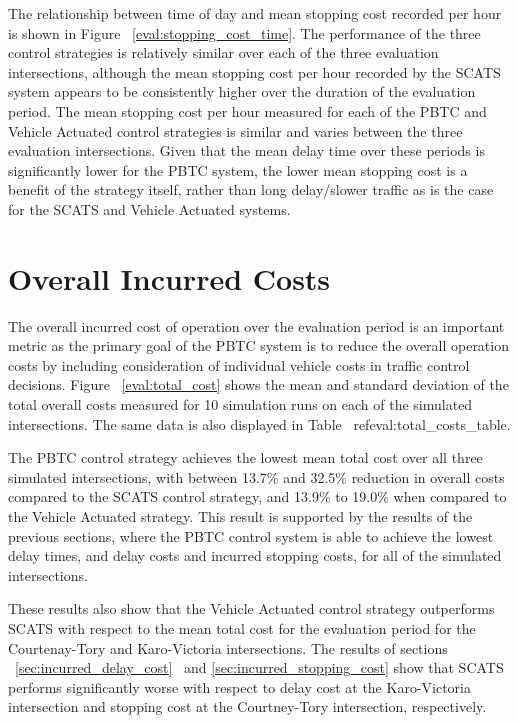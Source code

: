 {The relationship between time of day and mean stopping cost recorded per hour is shown in Figure ~\ref{eval:stopping_cost_time}. The performance of the three control strategies is relatively similar over each of the three evaluation intersections, although the mean stopping cost per hour recorded by the SCATS system appears to be consistently higher over the duration of the evaluation period. The mean stopping cost per hour measured for each of the PBTC and Vehicle Actuated control strategies is similar and varies between the three evaluation intersections. Given that the mean delay time over these periods is significantly lower for the PBTC system, the lower mean stopping cost is a benefit of the strategy itself, rather than long delay/slower traffic as is the case for the SCATS and Vehicle Actuated systems.

\section{Overall Incurred Costs}

The overall incurred cost of operation over the evaluation period is an important metric as the primary goal of the PBTC system is to reduce the overall operation costs by including consideration of individual vehicle costs in traffic control  decisions. Figure ~\ref{eval:total_cost} shows the mean and standard deviation of the total overall costs measured for 10 simulation runs on each of the simulated intersections. The same data is also displayed in Table ~ref{eval:total_costs_table}.

The PBTC control strategy achieves the lowest mean total cost over all three simulated intersections, with between 13.7\% and 32.5\% reduction in overall costs compared to the SCATS control strategy, and 13.9\% to 19.0\% when compared to the Vehicle Actuated strategy. This result is supported by the results of the previous sections, where the PBTC control system is able to achieve the lowest delay times, and delay costs and incurred stopping costs, for all of the simulated intersections. 

These results also show that the Vehicle Actuated control strategy outperforms SCATS with respect to the mean total cost for the evaluation period for the Courtenay-Tory and Karo-Victoria intersections. The results of sections ~\ref{sec:incurred_delay_cost}~ and \ref{sec:incurred_stopping_cost} show that SCATS performs significantly worse with respect to delay cost at the Karo-Victoria intersection and stopping cost at the Courtney-Tory intersection, respectively.

}
